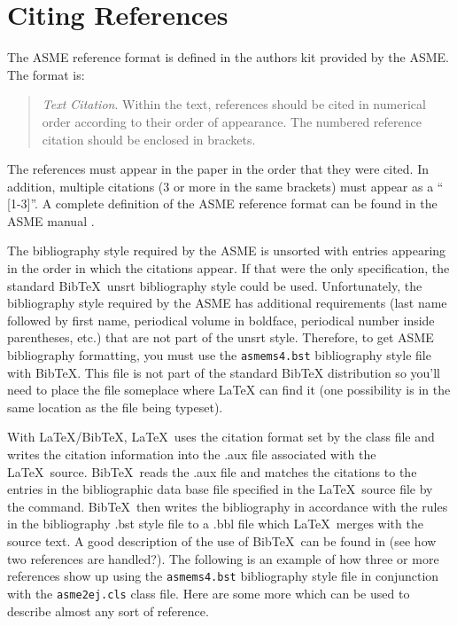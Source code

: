 \documentclass[twocolumn,10pt]{asme2ej}
\begin{document}
\section{Citing References}

The ASME reference format is defined in the authors kit provided by the ASME.  The format is:

\begin{quotation}
{\em Text Citation}. Within the text, references should be cited in  numerical order according to their order of appearance.  The numbered reference citation should be enclosed in brackets.
\end{quotation}

The references must appear in the paper in the order that they were cited.  In addition, multiple citations (3 or more in the same brackets) must appear as a `` [1-3]''.  A complete definition of the ASME reference format can be found in the  ASME manual \cite{asmemanual}.

The bibliography style required by the ASME is unsorted with entries appearing in the order in which the citations appear. If that were the only specification, the standard {\sc Bib}\TeX\ unsrt bibliography style could be used. Unfortunately, the bibliography style required by the ASME has additional requirements (last name followed by first name, periodical volume in boldface, periodical number inside parentheses, etc.) that are not part of the unsrt style. Therefore, to get ASME bibliography formatting, you must use the \verb+asmems4.bst+ bibliography style file with {\sc Bib}\TeX. This file is not part of the standard BibTeX distribution so you'll need to place the file someplace where LaTeX can find it (one possibility is in the same location as the file being typeset).

With \LaTeX/{\sc Bib}\TeX, \LaTeX\ uses the citation format set by the class file and writes the citation information into the .aux file associated with the \LaTeX\ source. {\sc Bib}\TeX\ reads the .aux file and matches the citations to the entries in the bibliographic data base file specified in the \LaTeX\ source file by the \verb++ command. {\sc Bib}\TeX\ then writes the bibliography in accordance with the rules in the bibliography .bst style file to a .bbl file which \LaTeX\ merges with the source text.  A good description of the use of {\sc Bib}\TeX\ can be found in \cite{latex, goosens} (see how two references are handled?).  The following is an example of how three or more references \cite{latex, asmemanual,  goosens} show up using the \verb+asmems4.bst+ bibliography style file in conjunction with the \verb+asme2ej.cls+ class file. Here are some more \cite{art, blt, ibk, icn, ips, mts, mis, pro, pts, trt, upd} which can be used to describe almost any sort of reference.
\end{document}
